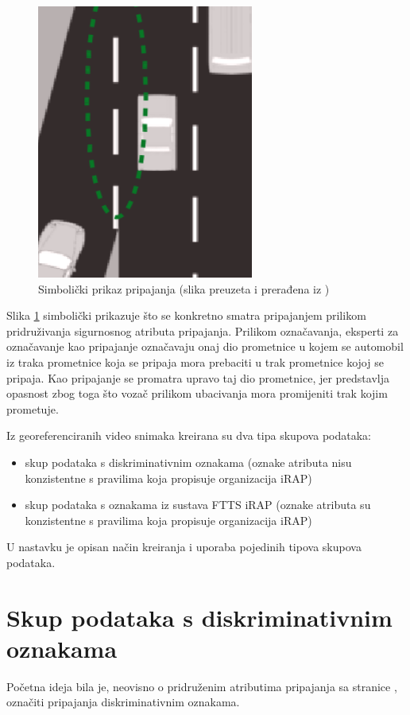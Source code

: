 \documentclass[times, utf8, diplomski, numeric]{fer}
\begin{document}
\begin{figure}[H]
\centering
\includegraphics[scale=0.75]{images/merge_lane.png}
\caption{Simbolički prikaz pripajanja (slika preuzeta i prerađena iz \citep{man:ftts_irap_coding_manual})}
\label{img:merge_lane_symbolic}
\end{figure}

\noindent Slika \ref{img:merge_lane_symbolic} simbolički prikazuje što se konkretno smatra pripajanjem prilikom pridruživanja sigurnosnog atributa pripajanja.
Prilikom označavanja, eksperti za označavanje kao pripajanje označavaju onaj dio prometnice u kojem se automobil iz traka prometnice koja se pripaja mora prebaciti u trak prometnice kojoj se pripaja.
Kao pripajanje se promatra upravo taj dio prometnice, jer predstavlja opasnost zbog toga što vozač prilikom ubacivanja mora promijeniti trak kojim prometuje.

Iz georeferenciranih video snimaka kreirana su dva tipa skupova podataka:
\begin{itemize}
 \item skup podataka s diskriminativnim oznakama (oznake atributa nisu konzistentne s pravilima koja propisuje organizacija iRAP)
 \item skup podataka s oznakama iz sustava FTTS iRAP (oznake atributa su konzistentne s pravilima koja propisuje organizacija iRAP)
\end{itemize}
U nastavku je opisan način kreiranja i uporaba pojedinih tipova skupova podataka.

\section{Skup podataka s diskriminativnim oznakama}
Početna ideja bila je, neovisno o pridruženim atributima pripajanja sa stranice \citep{url:ftts_irap}, označiti pripajanja diskriminativnim oznakama. 
\end{document}
